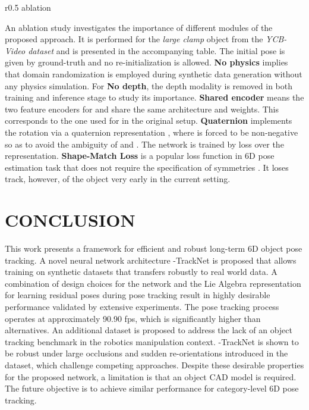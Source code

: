 \documentclass[letterpaper, 10 pt, conference]{ieeeconf}
\begin{document}
\begin{wrapfigure}{r}{0.5\linewidth}
\vspace{-0.1in}
{ablation}
\vspace{-0.17in}
\end{wrapfigure}
An ablation study investigates the importance of different modules of the proposed approach. It is performed for the {\it large clamp} object from the {\it YCB-Video dataset} and is presented in the accompanying table. The initial pose is given by ground-truth and no re-initialization is allowed. \textbf{No physics} implies that domain randomization is employed during synthetic data generation without any physics simulation. For \textbf{No depth}, the depth modality is removed in both training and inference stage to study its importance. \textbf{Shared encoder} means the two feature encoders for  and  share the same architecture and weights. This corresponds to the one used for  in the original setup. \textbf{Quaternion} implements the rotation via a quaternion representation , where  is forced to be non-negative so as to avoid the ambiguity of  and . The network is trained by  loss over the representation. \textbf{Shape-Match Loss} is a popular loss function in 6D pose estimation task that does not require the specification of symmetries \cite{xiang2017posecnn}. It loses track, however, of the object very early in the current setting.

 

\section{CONCLUSION}
This work presents a framework for efficient and robust long-term 6D object pose tracking. A novel neural network architecture -TrackNet is proposed that allows training on synthetic datasets that transfers robustly to real world data. A combination of design choices for the network and the Lie Algebra representation for learning residual poses during pose tracking result in highly desirable performance validated by extensive experiments. The pose tracking process operates at approximately 90.90 fps, which is significantly higher than alternatives. An additional dataset is proposed to address the lack of an object tracking benchmark in the robotics manipulation context. -TrackNet is shown to be robust under large occlusions and sudden re-orientations introduced in the dataset, which challenge competing approaches. Despite these desirable properties for the proposed network, a limitation is that an object CAD model is required. The future objective is to achieve similar performance for category-level 6D pose tracking. 






\end{document}
